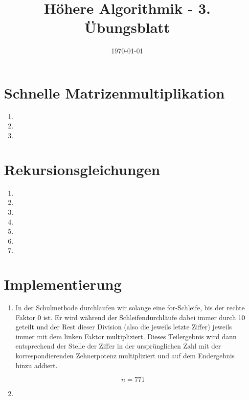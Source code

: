 \documentclass[a4paper,10pt]{scrartcl}
\title{H\"ohere Algorithmik - 3. \"Ubungsblatt}
\author{\Authors}
\date{\today}
\begin{document}
\maketitle

\section{Schnelle Matrizenmultiplikation}
\begin{enumerate}
\item   
\item   
\item   
\end{enumerate}


\section{Rekursionsgleichungen}
\begin{enumerate}
\item   
\item   
\item   
\item   
\item   
\item   
\item   
\end{enumerate}

\section{Implementierung}
\begin{enumerate}
\item   In der Schulmethode durchlaufen wir solange eine for-Schleife, bis der rechte Faktor 0 ist.
        Er wird während der Schleifendurchläufe dabei immer durch 10 geteilt und der Rest dieser Division (also die jeweils letzte Ziffer) jeweils immer mit dem linken Faktor multipliziert. Dieses Teilergebnis wird dann entsprechend der Stelle der Ziffer in der ursprünglichen Zahl mit der korrespondierenden Zehnerpotenz multipliziert und auf dem Endergebnis hinzu addiert.
        
        
        \[ n = 771 \]
\item   
\end{enumerate}
\end{document}
